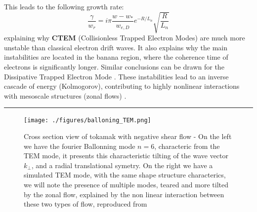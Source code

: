\documentclass[11pt,a4paper,openany]{report}
\begin{document}
\begin{multicols}{2}
    This leads to the following growth rate:
    $$\frac{\gamma}{w_r} = i \pi \frac{w - w_*}{w_{e,D}} e^{-R/L_n} \sqrt{\frac{R}{L_n}}$$
    explaining why \textbf{CTEM} (Collisionless Trapped Electron Modes) are much more unstable than classical electron drift waves. It also explains why the main instabilities are located in the banana region, where the coherence time of electrons is significantly longer. Similar conclusions can be drawn for the Dissipative Trapped Electron Mode \cite{Trapped_Particle_Mode}. These instabilities lead to an inverse cascade of energy (Kolmogorov), contributing to highly nonlinear interactions with mesoscale structures (zonal flows) \cite{San_diego, Krutkin_thesis, DW_transport}.

    \rule{\linewidth}{0.4pt}

\end{multicols}
\begin{figure}[H]
    \centering
    \texttt{[image: ./figures/balloning\_TEM.png]}
    \caption{Cross section view of tokamak with negative shear flow - On the left we have the fourier Ballonning mode $n = 6$, characteric from the TEM mode, it presents this characteristic tilting of the wave vector $k_{\perp}$, and a radial translational symetry. On the right we have a simulated TEM mode, with the same shape structure characterics, we will note the presence of multiple modes, teared and more tilted by the zonal flow, explained by the non linear interaction between these two types of flow, reproduced from \cite{TEM_simulation,Ballooning_transform} }
    \label{}
\end{figure}
\end{document}
